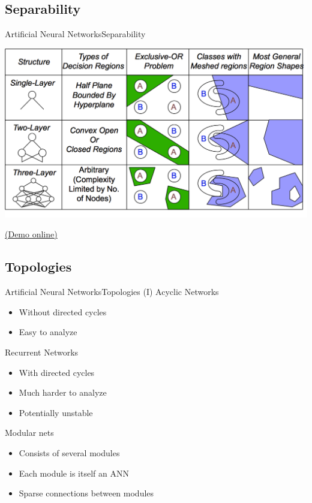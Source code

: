 \documentclass[10pt,compress]{beamer} %
\begin{document}
\subsection{Separability}
\begin{frame}{Artificial Neural Networks}{Separability}
    \begin{center}
	    \includegraphics[width=0.9\linewidth]{figs/sep.png}
    \end{center}
	\centering \href{http://playground.tensorflow.org/}{(Demo online)}
\end{frame}

\subsection{Topologies}
\begin{frame}{Artificial Neural Networks}{Topologies (I)}
    Acyclic Networks
    \begin{itemize}
        \item Without directed cycles 
        \item Easy to analyze
    \end{itemize}
    Recurrent Networks
    \begin{itemize}
        \item With directed cycles
        \item Much harder to analyze
        \item Potentially unstable
    \end{itemize}
    Modular nets
    \begin{itemize}
        \item Consists of several modules
        \item Each module is itself an ANN
        \item Sparse connections between modules
    \end{itemize}
\end{frame}
\end{document}
